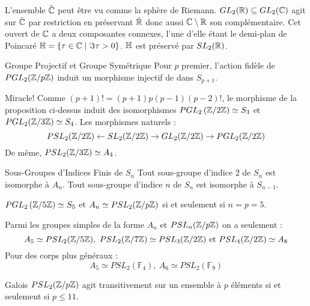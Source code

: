 \documentclass{cours}
\begin{document}
\begin{example}
    L'ensemble $\hat{\mathbb{C}}$ peut être vu comme la sphère de Riemann. $GL_{2}(\mathbb{R}) \subseteq GL_{2}(\mathbb{C})$ agit sur $\hat{\mathbb{C}}$ par restriction en préservant $\hat{\mathbb{R}}$ donc aussi $\mathbb{C} \setminus \mathbb{R}$ son complémentaire. 
    Cet ouvert de $\mathbb{C}$ a deux composantes connexes, l'une d'elle étant le demi-plan de Poincaré $\mathbb{H} = \left\{\tau \in \mathbb{C} \mid \Im \tau > 0\right\}$. $\mathbb{H}$ est préservé par $SL_{2}(\mathbb{R})$.
\end{example}

\begin{propositionfr}{Groupe Projectif et Groupe Symétrique}{}
    Pour $p$ premier, l'action fidèle de $PGL_{2}(\mathbb{Z}/p\mathbb{Z})$ induit un morphisme injectif de dans $S_{p + 1}$.
\end{propositionfr}
\begin{corollaire}{Miracle!}{}
    Comme $\left(p + 1\right)! = (p + 1) p (p-1)(p - 2)!$, le morphisme de la proposition ci-dessus induit des isomorphismes $PGL_{2}\left(\mathbb{Z}/2\mathbb{Z}\right) \simeq S_{3}$ et $PGL_{2}(\mathbb{Z}/3\mathbb{Z}) \simeq S_{4}$. Les morphismes naturels :
    \[
        PSL_{2}(\mathbb{Z}/2\mathbb{Z}) \leftarrow SL_{2}(\mathbb{Z}/2\mathbb{Z}) \rightarrow GL_{2}(\mathbb{Z}/2\mathbb{Z}) \rightarrow PGL_{2}(\mathbb{Z}/2\mathbb{Z})
    \]
    De même, $PSL_{2}(\mathbb{Z}/3\mathbb{Z}) \simeq A_{4}$.
\end{corollaire}

\begin{propositionfr}{Sous-Groupes d'Indices Finis de $S_{n}$}{}
    Tout sous-groupe d'indice $2$ de $S_{n}$ est isomorphe à $A_{n}$. Tout sous-groupe d'indice $n$ de $S_n$ est isomorphe à $S_{n - 1}$.
\end{propositionfr}

\begin{corollaire}{}{}
    $PGL_{2}\left(\mathbb{Z}/5\mathbb{Z}\right) \simeq S_{5}$ et $A_{n} \simeq PSL_{2}(\mathbb{Z}/p\mathbb{Z})$ si et seulement si $n = p = 5$.
\end{corollaire}

\begin{remark}
    Parmi les groupes simples de la forme $A_{n}$ et $PSL_{n}(\mathbb{Z}/p\mathbb{Z})$ on a seulement :
    \[
        A_{5} \simeq PSL_{2}(\znz{5}), \ PSL_{2}(\znz{7}) \simeq PSL_{3}(\znz{2}) \text{ et } PSL_{4}(\znz{2}) \simeq A_{8}
    \]
    Pour des corps plus généraux :
    \[
        A_{5} \simeq PSL_{2}(\mathbb{F}_{4}), \ A_{6} \simeq PSL_{2}(\mathbb{F}_{9})
    \]
\end{remark}

\begin{théorème}{Galois}{}
    $PSL_{2}(\mathbb{Z}/p\mathbb{Z})$ agit transitivement sur un ensemble à $p$ éléments si et seulement si $p \leq 11$.
\end{théorème}
\end{document}
